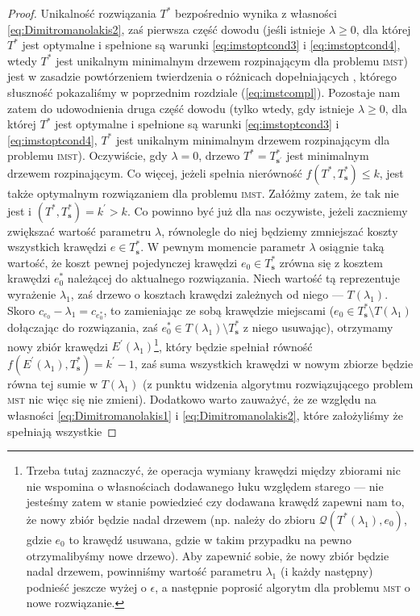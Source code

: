 {\begin{proof}
	Unikalność rozwiązania $T^{\ast}$ bezpośrednio wynika z własności \ref{eq:Dimitromanolakis2}, zaś pierwsza część dowodu (jeśli istnieje $\lambda \geqslant 0$, dla której $T^{\ast}$ jest optymalne i spełnione są warunki \ref{eq:imstoptcond3} i \ref{eq:imstoptcond4}, wtedy $T^{\ast}$ jest unikalnym minimalnym drzewem rozpinającym dla problemu \textsc{imst}) jest w zasadzie powtórzeniem twierdzenia o różnicach dopełniających , którego słuszność pokazaliśmy w poprzednim rozdziale (\ref{eq:imstcompl}). Pozostaje nam zatem do udowodnienia druga część dowodu (tylko wtedy, gdy istnieje $\lambda \geqslant 0$, dla której $T^{\ast}$ jest optymalne i spełnione są warunki \ref{eq:imstoptcond3} i \ref{eq:imstoptcond4}, $T^{\ast}$ jest unikalnym minimalnym drzewem rozpinającym dla problemu \textsc{imst}). Oczywiście, gdy $\lambda = 0$, drzewo $T^{\ast} = T^{\ast}_{\textbf{s}^{\prime}}$ jest minimalnym drzewem rozpinającym. Co więcej, jeżeli spełnia nierówność $f \left( T^{\ast}, T^{\ast}_{\textbf{s}} \right) \leqslant k$, jest także optymalnym rozwiązaniem dla problemu \textsc{imst}. Załóżmy zatem, że tak nie jest i $\left( T^{\ast}, T^{\ast}_{\textbf{s}} \right) = k^{\prime} > k$. Co powinno być już dla nas oczywiste, jeżeli zaczniemy zwiększać wartość parametru $\lambda$, równolegle do niej będziemy zmniejszać koszty wszystkich krawędzi $e \in T^{\ast}_{\textbf{s}}$. W pewnym momencie parametr $\lambda$ osiągnie taką wartość, że koszt pewnej pojedynczej krawędzi $e_{0} \in T^{\ast}_{\textbf{s}}$ zrówna się z kosztem krawędzi $e_{0}^{\ast}$ należącej do aktualnego rozwiązania. Niech wartość tą reprezentuje wyrażenie $\lambda_{1}$, zaś drzewo o kosztach krawędzi zależnych od niego --- $T \left( \lambda_{1} \right)$. Skoro $c_{e_{0}} - \lambda_{1} = c_{e_{0}^{\ast}}$, to zamieniając ze sobą krawędzie miejscami ($e_{0} \in T^{\ast}_{\textbf{s}} \setminus T \left( \lambda_{1} \right)$ dołączając do rozwiązania, zaś $e_{0}^{\ast} \in T \left( \lambda_{1} \right) \setminus T^{\ast}_{\textbf{s}}$ z niego usuwając), otrzymamy nowy zbiór krawędzi $E^{\prime} \left( \lambda_{1} \right)$\footnote{Trzeba tutaj zaznaczyć, że operacja wymiany krawędzi między zbiorami nic nie wspomina o własnościach dodawanego łuku względem starego --- nie jesteśmy zatem w stanie powiedzieć czy dodawana krawędź zapewni nam to, że nowy zbiór będzie nadal drzewem (np. należy do zbioru $\mathcal{Q} \left( T^{\ast} \left( \lambda_{1} \right), e_{0} \right)$, gdzie $e_{0}$ to krawędź usuwana, gdzie w takim przypadku na pewno otrzymalibyśmy nowe drzewo). Aby zapewnić sobie, że nowy zbiór będzie nadal drzewem, powinniśmy wartość parametru $\lambda_{1}$ (i każdy następny) podnieść jeszcze wyżej o $\epsilon$, a następnie poprosić algorytm dla problemu \textsc{mst} o nowe rozwiązanie.}, który będzie spełniał równość $f \left( E^{\prime} \left( \lambda_{1} \right), T^{\ast}_{\textbf{s}} \right) = k^{\prime} - 1$, zaś suma wszystkich krawędzi w nowym zbiorze będzie równa tej sumie w $T \left( \lambda_{1} \right)$ (z punktu widzenia algorytmu rozwiązującego problem \textsc{mst} nic więc się nie zmieni). Dodatkowo warto zauważyć, że ze względu na własności \ref{eq:Dimitromanolakis1} i \ref{eq:Dimitromanolakis2}, które założyliśmy że spełniają wszystkie 
\end{proof}}
